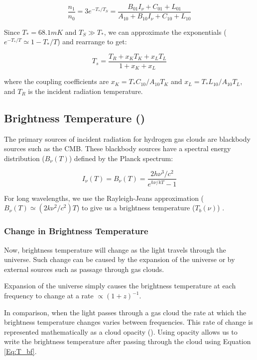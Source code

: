 \begin{equation}
\frac{n_1}{n_0} = 3 e^{-T_*/T_S} = \frac{B_{01} I_\nu + C_{01}+ L_{01}}{A_{10}+ B_{10} I_\nu + C_{10} +L_{10}}
\end{equation}

Since $T_* = 68.1 mK$ and $T_S \gg T_*$, we can approximate the exponentials ($e^{-T_*/T} \simeq 1-T_*/T$) and rearrange to get:

\begin{equation}\label{Eq:dT_s}
T_s = \frac{T_{R} + x_K T_{K} + x_{L} T_{L}}{1+x_K +x_{L}}
\end{equation}

where the coupling coefficients are $x_K = T_* C_{10}/A_{10} T_K$ and $x_L = T_* L_{10} / A_{10} T_L$, and $T_R$ is the incident radiation temperature. 

\subsection{Brightness Temperature (\tb)}
The primary sources of incident radiation for hydrogen gas clouds are blackbody sources such as the CMB. These blackbody sources have a spectral energy distribution ($B_\nu (T)$) defined by the Planck spectrum:

\begin{equation}
I_{\nu} (T) = B_{\nu}(T) = \frac{ 2 h \nu^3 / c^2}{e^{h \nu / k T}-1}
\end{equation}

For long wavelengths, we use the Rayleigh-Jeans approximation ($B_{\nu} (T) \simeq (2 k \nu^2 / c^2) T$) to give us a brightness temperature ($T_b (\nu)$) \cite{carroll2007}. 

\subsubsection{Change in Brightness Temperature}
Now, brightness temperature will change as the light travels through the universe. Such change can be caused by the expansion of the universe or by external sources such as passage through gas clouds. 

Expansion of the universe simply causes the brightness temperature at each frequency to change at a rate $\propto (1+z)^{-1}$. 

In comparison, when the light passes through a gas cloud the rate at which the brightness temperature changes varies between frequencies. This rate of change is represented mathematically as a cloud opacity (\tu). Using opacity allows us to write the brightness temperature after passing through the cloud using Equation \ref{Eq:T_bf}. 

